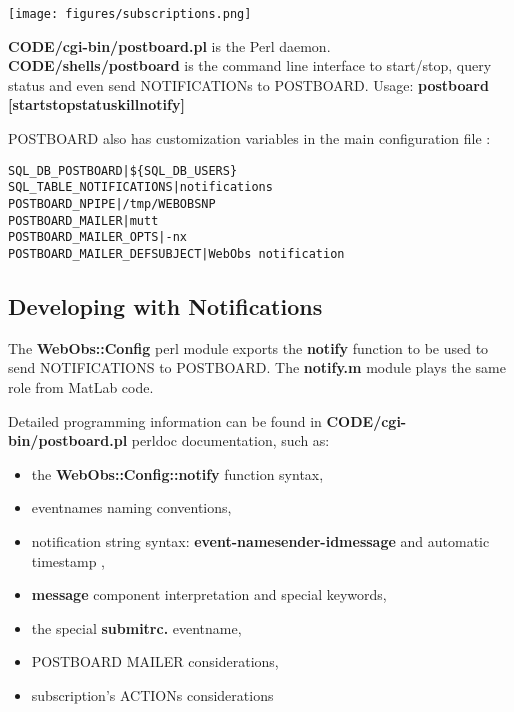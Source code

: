 \texttt{[image: figures/subscriptions.png]}

\textbf{CODE/cgi-bin/postboard.pl} is the Perl daemon.\\ 
\textbf{CODE/shells/postboard} is the command line interface 
to start/stop, query status and even send NOTIFICATIONs to POSTBOARD. 
Usage: \textbf{postboard [start\textbar stop\textbar status\textbar kill\textbar notify] }

POSTBOARD also has customization variables in the main configuration file :

\begin{lstlisting}[title=\wofile{WEBOBS.rc} (excerpt)]
SQL_DB_POSTBOARD|${SQL_DB_USERS}
SQL_TABLE_NOTIFICATIONS|notifications
POSTBOARD_NPIPE|/tmp/WEBOBSNP
POSTBOARD_MAILER|mutt
POSTBOARD_MAILER_OPTS|-nx
POSTBOARD_MAILER_DEFSUBJECT|WebObs notification
\end{lstlisting}

\subsection{Developing with Notifications}

The \textbf{WebObs::Config} perl module exports the \textbf{notify} function to be used to send NOTIFICATIONS to POSTBOARD.
The \textbf{notify.m} module plays the same role from MatLab code. 

Detailed programming information can be found in \textbf{CODE/cgi-bin/postboard.pl} perldoc documentation, such as:

\begin{itemize}
\item   the \textbf{WebObs::Config::notify} function syntax,
\item   eventnames naming conventions,
\item   notification string syntax: \textbf{event-name}\textbar\textbf{sender-id}\textbar\textbf{message} and automatic timestamp ,
\item   \textbf{message} component interpretation and special keywords, 
\item   the special \textbf{submitrc.} eventname,
\item   POSTBOARD MAILER considerations,
\item   subscription's ACTIONs considerations
\end{itemize}


